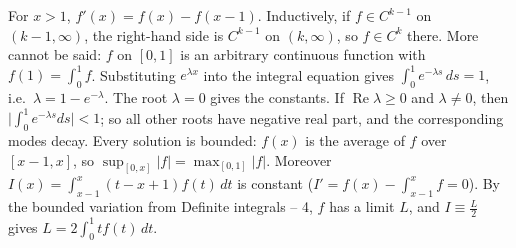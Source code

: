 \documentclass[11pt,a4paper]{article}
\begin{document}
 For \(x\gt1\), \(f'(x)=f(x)-f(x-1)\). Inductively, if \(f\in C^{k-1}\) on \((k-1,\infty)\), the right-hand side is \(C^{k-1}\) on \((k,\infty)\), so \(f\in C^k\) there. More cannot be said: \(f\) on \([0,1]\) is an arbitrary continuous function with \(f(1)=\int_0^1f\).
 Substituting \(e^{\lambda x}\) into the integral equation gives \(\int_0^1e^{-\lambda s}\,ds=1\), i.e.\ \(\lambda=1-e^{-\lambda}\). The root \(\lambda=0\) gives the constants. If \(\operatorname{Re}\lambda\ge0\) and \(\lambda\ne0\), then \(\bigl|\int_0^1e^{-\lambda s}ds\bigr|\lt1\); so all other roots have negative real part, and the corresponding modes decay.
 Every solution is bounded: \(f(x)\) is the average of \(f\) over \([x-1,x]\), so \(\sup_{[0,x]}|f|=\max_{[0,1]}|f|\). Moreover \(I(x)=\int_{x-1}^x(t-x+1)f(t)\,dt\) is constant (\(I'=f(x)-\int_{x-1}^xf=0\)). By the bounded variation from Definite integrals -- 4, \(f\) has a limit \(L\), and \(I\equiv\frac L2\) gives \(L=2\int_0^1tf(t)\,dt\).
\end{document}

